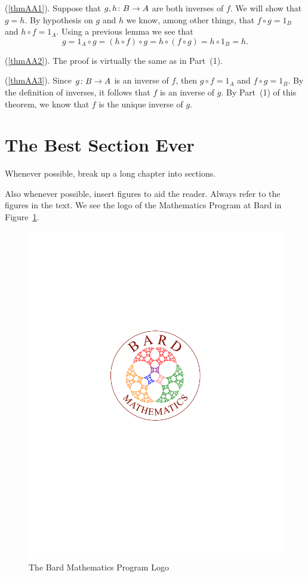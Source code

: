 \documentclass[11pt, twoside, reqno]{book}
\begin{document}
\demo
(\ref{thmAA1}). Suppose that ${g, h} \colon {B} \to {A}$ are both inverses of $f$.  We will show that $g = h$.  By hypothesis on $g$ and $h$ we know, among other things, that $f \circ g = 1_B$ and $h \circ f = 1_A$.  Using a previous lemma we see that
%
\[
g  =  1_A \circ g  =  (h \circ f) \circ g  =  h \circ (f \circ g)  =  h \circ 1_B  =  h.
\]

\noindent (\ref{thmAA2}). The proof is virtually the same as in Part~(1).  
\smallskip

\noindent (\ref{thmAA3}).  Since ${g} \colon {B} \to {A}$ is an inverse of $f$, then $g \circ f = 1_A$ and $f \circ g = 1_B$.  By the definition of inverses, it follows that $f$ is an inverse of $g$.  By Part~(1) of this theorem, we know that $f$ is the unique inverse of $g$.
\edemo


\section{The Best Section Ever}
\label{secA2}

Whenever possible, break up a long chapter into sections.

Also whenever possible, insert figures to aid the reader.  Always refer to the figures in the text.  We see the logo of the Mathematics Program at Bard in Figure~\ref{figMATHBARD}.

\begin{figure}[ht]
\centering
\includegraphics[scale=0.75]{math_prog_logo.pdf}
\caption{The Bard Mathematics Program Logo}
\label{figMATHBARD}
\end{figure}
\end{document}
